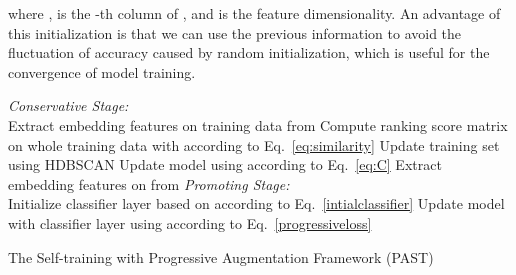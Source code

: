 \documentclass[10pt,twocolumn,letterpaper]{article}
\begin{document}
where ,  is the -th column of , and  is the feature dimensionality. 
An advantage of this initialization is that we can use the previous information to avoid the fluctuation of accuracy caused by random initialization, which is useful for the convergence of model training.

\setlength{\textfloatsep}{0.1cm}
\begin{algorithm}[t]
	\begin{footnotesize}
		\SetAlgoLined
		\For{ \KwTo }
		{
        \vspace{0.1cm}
		{\emph{Conservative Stage:}}\\
		Extract embedding features  on training data  from \;
		Compute ranking score matrix  on whole training data  with  according to Eq.~\eqref{eq:similarity}\;
		Update training set  using HDBSCAN\;
		Update model  using  according to Eq.~\eqref{eq:C}\;
		Extract embedding features  on  from \;
	   \vspace{0.1cm}
		{\emph{Promoting Stage:}}\\
		Initialize classifier layer  based on  according to Eq.~\eqref{intialclassifier}\;
		Update model  with classifier layer using  according to Eq.~\eqref{progressiveloss}\;
        }
		\caption{The Self-training with Progressive Augmentation Framework (PAST)}\label{algo}
	\end{footnotesize}
\end{algorithm}
\setlength{\floatsep}{0.15cm}
\end{document}
